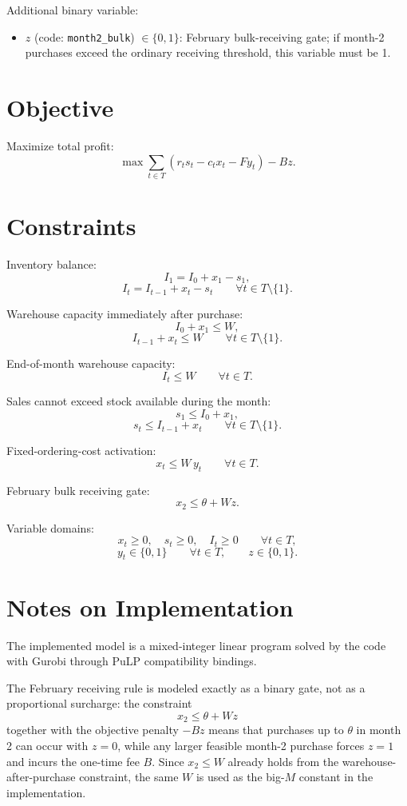 Additional binary variable:
\begin{itemize}
  \item \(z\) (code: \texttt{month2\_bulk}) \(\in \{0,1\}\): February bulk-receiving gate; if month-2 purchases exceed the ordinary receiving threshold, this variable must be 1.
\end{itemize}

\section*{Objective}

Maximize total profit:
\[
\max \sum_{t\in T} \left(r_t s_t - c_t x_t - F y_t\right) - B z.
\]

\section*{Constraints}

Inventory balance:
\[
I_1 = I_0 + x_1 - s_1,
\]
\[
I_t = I_{t-1} + x_t - s_t \qquad \forall t\in T\setminus\{1\}.
\]

Warehouse capacity immediately after purchase:
\[
I_0 + x_1 \le W,
\]
\[
I_{t-1} + x_t \le W \qquad \forall t\in T\setminus\{1\}.
\]

End-of-month warehouse capacity:
\[
I_t \le W \qquad \forall t\in T.
\]

Sales cannot exceed stock available during the month:
\[
s_1 \le I_0 + x_1,
\]
\[
s_t \le I_{t-1} + x_t \qquad \forall t\in T\setminus\{1\}.
\]

Fixed-ordering-cost activation:
\[
x_t \le W\, y_t \qquad \forall t\in T.
\]

February bulk receiving gate:
\[
x_2 \le \theta + W z.
\]

Variable domains:
\[
x_t \ge 0,\quad s_t \ge 0,\quad I_t \ge 0 \qquad \forall t\in T,
\]
\[
y_t \in \{0,1\} \qquad \forall t\in T,\qquad z\in\{0,1\}.
\]

\section*{Notes on Implementation}

The implemented model is a mixed-integer linear program solved by the code with Gurobi through PuLP compatibility bindings.

The February receiving rule is modeled exactly as a binary gate, not as a proportional surcharge: the constraint
\[
x_2 \le \theta + W z
\]
together with the objective penalty \(-Bz\) means that purchases up to \(\theta\) in month 2 can occur with \(z=0\), while any larger feasible month-2 purchase forces \(z=1\) and incurs the one-time fee \(B\). Since \(x_2 \le W\) already holds from the warehouse-after-purchase constraint, the same \(W\) is used as the big-\(M\) constant in the implementation.

